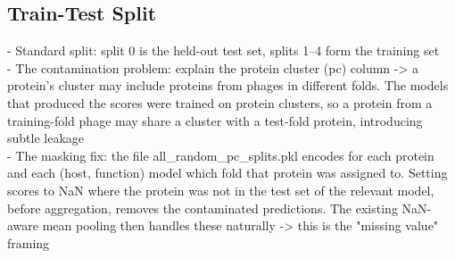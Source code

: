 \subsection{Train-Test Split}
\noindent - Standard split: split 0 is the held-out test set, splits 1–4 form the training set\\
- The contamination problem: explain the protein cluster (pc) column -> a protein's cluster may include proteins from phages in different folds. The models that produced the scores were trained on protein clusters, so a protein from a training-fold phage may share a cluster with a test-fold protein, introducing subtle leakage\\
- The masking fix: the file all\_random\_pc\_splits.pkl encodes for each protein and each (host, function) model which fold that protein was assigned to. Setting scores to NaN where the protein was not in the test set of the relevant model, before aggregation, removes the contaminated predictions. The existing NaN-aware mean pooling then handles these naturally -> this is the "missing value" framing\\